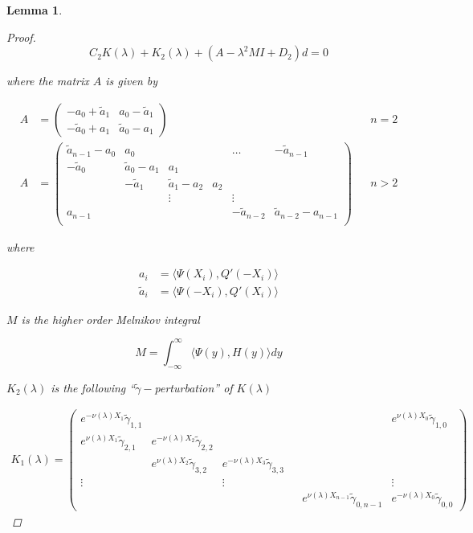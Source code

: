 \documentclass[12pt]{article}
\newtheorem{lemma}{Lemma}
\begin{document}
\begin{lemma}
\begin{proof}
\[
C_2 K(\lambda) + K_2(\lambda) + (A - \lambda^2 M I + D_2)d = 0
\]

where the matrix $A$ is given by

\begin{align*}
A &= \begin{pmatrix}
-a_0 + \tilde{a}_1 & a_0 - \tilde{a}_1 \\
-\tilde{a}_0 + a_1 & \tilde{a}_0 - a_1
\end{pmatrix} && n = 2 \\
A &= \begin{pmatrix}
\tilde{a}_{n-1} - a_0 & a_0 & & & \dots & -\tilde{a}_{n-1}\\
-\tilde{a}_0 & \tilde{a}_0 - a_1 &  a_1 \\
& -\tilde{a}_1 & \tilde{a}_1 - a_2 &  a_2 \\
& & \vdots & & \vdots \\
a_{n-1} & & & & -\tilde{a}_{n-2} & \tilde{a}_{n-2} - a_{n-1} \\
\end{pmatrix} && n > 2
\end{align*}

where

\begin{align*}
a_i &= \langle \Psi(X_i), Q'(-X_i) \rangle \\
\tilde{a}_i &= \langle \Psi(-X_i), Q'(X_i) \rangle
\end{align*}

$M$ is the higher order Melnikov integral

\[
M = \int_{-\infty}^\infty \langle \Psi(y), H(y) \rangle dy
\]

$K_2(\lambda)$ is the following ``$\tilde{\gamma}-$perturbation'' of $K(\lambda)$ 

\begin{align*}
K_1(\lambda) =  
\begin{pmatrix}
e^{-\nu(\lambda)X_1} \tilde{\gamma}_{1,1} & & & & & e^{\nu(\lambda)X_0}\tilde{\gamma}_{1,0} \\
e^{\nu(\lambda)X_1}\tilde{\gamma}_{2,1} & e^{-\nu(\lambda)X_2}\tilde{\gamma}_{2,2} \\
& e^{\nu(\lambda)X_2}\tilde{\gamma}_{3,2} & e^{-\nu(\lambda)X_3}\tilde{\gamma}_{3,3} \\
\vdots & & \vdots & &&  \vdots \\
& & & & e^{\nu(\lambda)X_{n-1}}\tilde{\gamma}_{0,n-1} & e^{-\nu(\lambda)X_0}\tilde{\gamma}_{0,0} 
\end{pmatrix}
\end{align*}


\end{proof}
\end{lemma}
\end{document}
